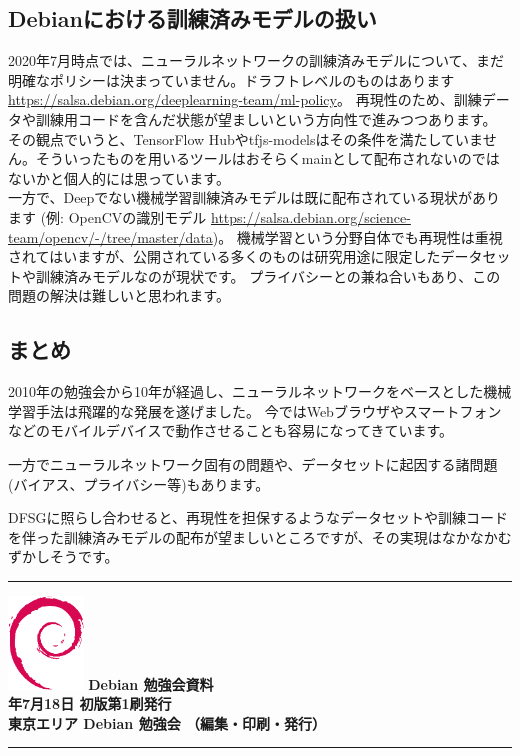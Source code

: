 \documentclass[mingoth,a4paper]{jsarticle}
\newcommand{\debmtgyear}{2020}
\newcommand{\debmtgmonth}{7}
\newcommand{\debmtgdate}{18}
\begin{document}
\subsection{Debianにおける訓練済みモデルの扱い}

2020年7月時点では、ニューラルネットワークの訓練済みモデルについて、まだ明確なポリシーは決まっていません。ドラフトレベルのものはあります \url{https://salsa.debian.org/deeplearning-team/ml-policy}。
再現性のため、訓練データや訓練用コードを含んだ状態が望ましいという方向性で進みつつあります。\\
その観点でいうと、TensorFlow Hubやtfjs-modelsはその条件を満たしていません。そういったものを用いるツールはおそらくmainとして配布されないのではないかと個人的には思っています。\\
一方で、Deepでない機械学習訓練済みモデルは既に配布されている現状があります (例: OpenCVの識別モデル \url{https://salsa.debian.org/science-team/opencv/-/tree/master/data})。
機械学習という分野自体でも再現性は重視されてはいますが、公開されている多くのものは研究用途に限定したデータセットや訓練済みモデルなのが現状です。
プライバシーとの兼ね合いもあり、この問題の解決は難しいと思われます。

\subsection{まとめ}

2010年の勉強会から10年が経過し、ニューラルネットワークをベースとした機械学習手法は飛躍的な発展を遂げました。
今ではWebブラウザやスマートフォンなどのモバイルデバイスで動作させることも容易になってきています。

一方でニューラルネットワーク固有の問題や、データセットに起因する諸問題(バイアス、プライバシー等)もあります。

DFSGに照らし合わせると、再現性を担保するようなデータセットや訓練コードを伴った訓練済みモデルの配布が望ましいところですが、その実現はなかなかむずかしそうです。


\mbox{}\newpage

\vspace*{15cm}
\hrule
\vspace{2mm}
\includegraphics[width=2cm]{image200502/openlogo-nd.eps}
\noindent \Large \bf Debian 勉強会資料\\
\noindent \normalfont \debmtgyear{}年\debmtgmonth{}月\debmtgdate{}日 \hspace{5mm}  初版第1刷発行\\
\noindent \normalfont 東京エリア Debian 勉強会 （編集・印刷・発行）\\
\hrule
\end{document}
